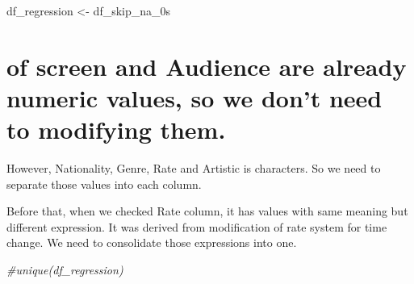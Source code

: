 \documentclass[
]{article}
\newenvironment{Shaded}{\begin{snugshade}}{\end{snugshade}}
\newcommand{\CommentTok}[1]{\textcolor[rgb]{0.56,0.35,0.01}{\textit{#1}}}
\newcommand{\NormalTok}[1]{#1}
\newcommand{\OtherTok}[1]{\textcolor[rgb]{0.56,0.35,0.01}{#1}}
\begin{document}
\begin{Shaded}
\begin{Highlighting}[]
\NormalTok{df\_regression }\OtherTok{\textless{}{-}}\NormalTok{ df\_skip\_na\_0s}
\end{Highlighting}
\end{Shaded}

\hypertarget{of-screen-and-audience-are-already-numeric-values-so-we-dont-need-to-modifying-them.}{%
\section{of screen and Audience are already numeric values, so we don't
need to modifying
them.}\label{of-screen-and-audience-are-already-numeric-values-so-we-dont-need-to-modifying-them.}}

However, Nationality, Genre, Rate and Artistic is characters. So we need
to separate those values into each column.

Before that, when we checked Rate column, it has values with same
meaning but different expression. It was derived from modification of
rate system for time change. We need to consolidate those expressions
into one.

\begin{Shaded}
\begin{Highlighting}[]
\CommentTok{\#unique(df\_regression)}
\end{Highlighting}
\end{Shaded}
\end{document}

